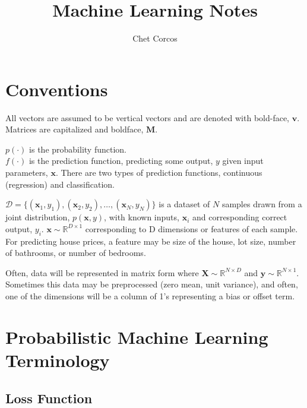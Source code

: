 \documentclass[11pt]{article}
\title{Machine Learning Notes}
\author{Chet Corcos}
\newcommand{\vct}[1]{\boldsymbol{#1}} %
\newcommand{\mat}[1]{\boldsymbol{#1}} %
\newcommand{\ProbOpr}[1]{\mathbb{#1}}
\begin{document}
\maketitle

\tableofcontents

\newpage

\section{Conventions}

All vectors are assumed to be vertical vectors and are denoted with bold-face, $\vct{v}$.   \\
Matrices are capitalized and boldface, $\mat{M}$.  

$p(\cdot)$ is the probability function.  \\
$f(\cdot)$ is the prediction function, predicting some output, $y$ given input parameters, $\vct{x}$. There are two types of prediction functions, continuous (regression) and classification.

$\mathcal{D} = \{ (\vct{x}_1,y_1), (\vct{x}_2, y_2), \hdots, (\vct{x}_N,y_N)\}$ is a dataset of $N$ samples drawn from a joint distribution, $p(\vct{x}, y)$, with known inputs, $\vct{x}_i$ and corresponding correct output, $y_i$. $\vct{x} \sim \ProbOpr{R}^{D \times 1}$ corresponding to D dimensions or features of each sample. For predicting house prices, a feature may be size of the house, lot size, number of bathrooms, or number of bedrooms.

Often, data will be represented in matrix form where $\mat{X} \sim \ProbOpr{R}^{N \times D}$ and $\vct{y} \sim \ProbOpr{R}^{N \times 1}$. Sometimes this data may be preprocessed (zero mean, unit variance), and often, one of the dimensions will be a column of 1's representing a bias or offset term.

\section{Probabilistic Machine Learning Terminology}

\subsection{Loss Function}
\end{document}
